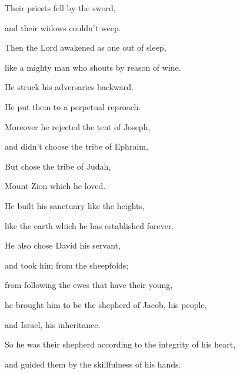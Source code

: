 {\par }{\Q {}Their priests fell by the sword,
\par }{\QB and their widows couldn’t weep.
\par }{\Q {}Then the Lord awakened as one out of sleep,
\par }{\QB like a mighty man who shouts by reason of wine.
\par }{\Q {}He struck his adversaries backward.
\par }{\QB He put them to a perpetual reproach.
\par }{\Q {}Moreover he rejected the tent of Joseph,
\par }{\QB and didn’t choose the tribe of Ephraim,
\par }{\Q {}But chose the tribe of Judah,
\par }{\QB Mount Zion which he loved.
\par }{\Q {}He built his sanctuary like the heights,
\par }{\QB like the earth which he has established forever.
\par }{\Q {}He also chose David his servant,
\par }{\QB and took him from the sheepfolds;
\par }{\Q {}from following the ewes that have their young,
\par }{\QB he brought him to be the shepherd of Jacob, his people,
\par }{\QB and Israel, his inheritance.
\par }{\Q {}So he was their shepherd according to the integrity of his heart,
\par }{\QB and guided them by the skillfulness of his hands.
\par }{\BB \par }
